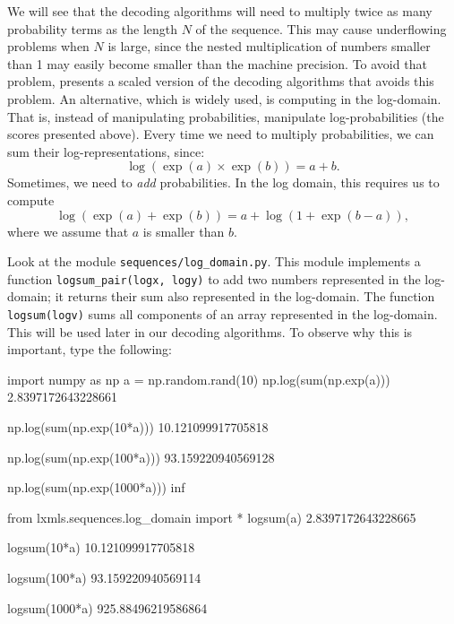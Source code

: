 We will see that the decoding algorithms 
will need to multiply twice as many probability terms as 
the length $N$ of the sequence. 
This may cause underflowing problems 
when $N$ is large, since the nested multiplication of numbers smaller than 1
may easily become smaller than the machine precision. To avoid that
problem, \cite{rabiner} presents a scaled version of the decoding algorithms that avoids this problem.
An alternative, which is widely used, is computing
in the log-domain. That is, instead of 
manipulating probabilities, manipulate log-probabilities (the scores presented above). 
Every time we need to multiply probabilities, 
we can sum their log-representations, since:
\begin{equation}
\log(\exp(a) \times \exp(b)) = a+b.
\end{equation}
Sometimes, we need to \emph{add} probabilities. 
In the log domain, this requires us to compute 
\begin{equation}
\log(\exp(a) + \exp(b)) = a + \log(1 + \exp(b-a)),
\end{equation}
where we assume that $a$ is smaller than $b$.


\begin{exercise}
Look at the module {\tt sequences/log\_domain.py}. 
This module implements a function
{\tt logsum\_pair(logx, logy)} to 
add two numbers represented in the log-domain;
it returns their sum also represented in the log-domain. The function {\tt logsum(logv)} 
sums all components of an array 
represented in the log-domain. 
This will be used later in our decoding algorithms.
To observe why this is important, type the 
following:
\begin{python}
import numpy as np
a = np.random.rand(10)
np.log(sum(np.exp(a)))
2.8397172643228661

np.log(sum(np.exp(10*a)))
10.121099917705818

np.log(sum(np.exp(100*a)))
93.159220940569128

np.log(sum(np.exp(1000*a)))
inf

from lxmls.sequences.log_domain import *
logsum(a)
2.8397172643228665

logsum(10*a)
10.121099917705818

logsum(100*a)
93.159220940569114

logsum(1000*a)
925.88496219586864
\end{python}
\end{exercise}


